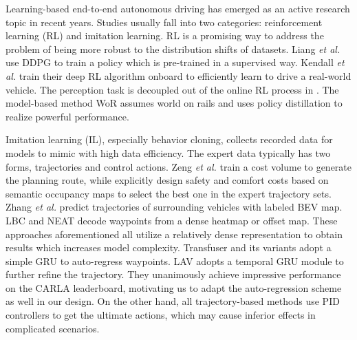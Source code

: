 \documentclass{article}
\begin{document}
Learning-based end-to-end autonomous driving has emerged as an active research topic in recent years. Studies usually fall into two categories: reinforcement learning (RL) and imitation learning.
RL is a promising way to address the problem of being more robust to the distribution shifts of datasets. Liang \textit{et al.} \citep{liang2018cirl} use DDPG to train a policy which is pre-trained in a supervised way. Kendall \textit{et al.} \citep{kendall2019driveaday} train their deep RL algorithm onboard to efficiently learn to drive a real-world vehicle.
The perception task is decoupled out of the online RL process in \citep{toromanoff2020modelfreerl, chekroun2021gri, zhao2022cadre}. The model-based method WoR \citep{chen2021wor} assumes world on rails and uses policy distillation to realize powerful performance.

Imitation learning (IL), especially behavior cloning, collects recorded data for models to mimic with high data efficiency. The expert data typically has two forms, trajectories and control actions.
Zeng \textit{et al.} \citep{zeng2019nmp} train a cost volume to generate the planning route, while \citep{sadat2020p3, casas2021mp3, hu2022stp3} explicitly design safety and comfort costs based on semantic occupancy maps to select the best one in the expert trajectory sets.
Zhang \textit{et al.} \citep{zhang2021lbw} predict trajectories of surrounding vehicles with labeled BEV map. LBC \citep{chen2020lbc} and NEAT \citep{chitta2021neat} decode waypoints from a dense heatmap or offset map. 
These approaches aforementioned all utilize a relatively dense representation to obtain results which increases model complexity. Transfuser and its variants \citep{prakash2021transfuser, jaeger2021transfuser+} adopt a simple GRU to auto-regress waypoints. 
LAV \citep{chen2022lav} adopts a temporal GRU module to further refine the trajectory. They unanimously achieve impressive performance on the CARLA leaderboard, motivating us to adapt the auto-regression scheme as well in our design. On the other hand, 
all trajectory-based methods use PID controllers to get the ultimate actions, which may cause inferior effects in complicated scenarios. 
\end{document}
